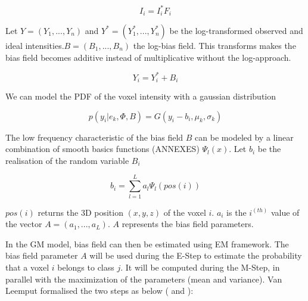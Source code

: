   \begin{equation*}
  I_i=I_i^*F_i
  \end{equation*}

Let $Y=(Y_1, ..., Y_n)$ and $Y^*=(Y_1^*, ..., Y_n^*)$ be the log-transformed observed and ideal intensities.$B=(B_1, ..., B_n)$ the log-bias field. This transforms makes the bias field becomes additive instead of multiplicative without the log-approach.

  \begin{equation*}
  Y_i=Y_i^* + B_i
  \end{equation*}
  
We can model the PDF of the voxel intensity with a gaussian distribution

 \begin{equation*}
  p(y_i|e_k, \Phi, B) = G(y_i-b_i,\mu_k,\sigma_k)
  \end{equation*}
  
The low frequency characteristic of the bias field $B$ can be modeled by a linear combination of smooth basics functions (ANNEXES) $\Psi_l(x)$. Let $b_i$ be the realisation of the random variable $B_i$ 

  \begin{equation*}
  b_i = \sum_{l=1}^L a_l\Psi_l(pos(i))
  \end{equation*}
  
 $pos(i)$ returns the 3D position $(x,y,z)$ of the voxel $i$. $a_i$ is the $i^{(th)}$ value of the vector $A=(a_1, ..., a_L)$. $A$ represents the bias field parameters.
 \par
In the GM model, bias field can then be estimated using EM framework. The bias field parameter $A$ will be used during the E-Step to estimate the probability that a voxel $i$ belongs to class $j$. It will be computed during the M-Step, in parallel with the maximization of the parameters (mean and variance).
Van Leemput formalised the two steps as below (\cite{8} and \cite{9}):\\

